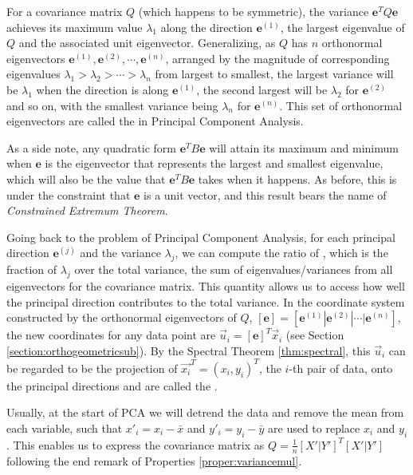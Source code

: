 \begin{thm}
For a covariance matrix $Q$ (which happens to be symmetric), the variance $\textbf{e}^T Q \textbf{e}$ achieves its maximum value $\lambda_1$ along the direction $\textbf{e}^{(1)}$, the largest eigenvalue of $Q$ and the associated unit eigenvector. Generalizing, as $Q$ has $n$ orthonormal eigenvectors $\textbf{e}^{(1)}, \textbf{e}^{(2)}, \cdots, \textbf{e}^{(n)}$, arranged by the magnitude of corresponding eigenvalues $\lambda_1 > \lambda_2 > \cdots > \lambda_n$ from largest to smallest, the largest variance will be $\lambda_1$ when the direction is along $\textbf{e}^{(1)}$, the second largest will be $\lambda_2$ for $\textbf{e}^{(2)}$ and so on, with the smallest variance being $\lambda_n$ for $\textbf{e}^{(n)}$. This set of orthonormal eigenvectors are called the  in Principal Component Analysis.
\end{thm}
As a side note, any quadratic form $\textbf{e}^TB\textbf{e}$ will attain its maximum and minimum when $\textbf{e}$ is the eigenvector that represents the largest and smallest eigenvalue, which will also be the value that $\textbf{e}^TB\textbf{e}$ takes when it happens. As before, this is under the constraint that $\textbf{e}$ is a unit vector, and this result bears the name of \textit{Constrained Extremum Theorem}.\par
Going back to the problem of Principal Component Analysis, for each principal direction $\textbf{e}^{(j)}$ and the variance $\lambda_{j}$, we can compute the ratio of , which is the fraction of  $\lambda_{j}$ over the total variance, the sum of eigenvalues/variances from all eigenvectors for the covariance matrix. This quantity allows us to access how well the principal direction contributes to the total variance. In the coordinate system constructed by the orthonormal eigenvectors of $Q$, $[\textbf{e}] = [\textbf{e}^{(1)}|\textbf{e}^{(2)}|\cdots|\textbf{e}^{(n)}]$, the new coordinates for any data point are $\vec{u}_i = [\textbf{e}]^T \vec{x}_i$ (see Section \ref{section:orthogeometricsub}). By the Spectral Theorem \ref{thm:spectral}, this $\vec{u}_i$ can be regarded to be the projection of $\vec{x_i}^T = (x_i, y_i)^T$, the $i$-th pair of data, onto the principal directions and are called the . \par
Usually, at the start of PCA we will detrend the data and remove the mean from each variable, such that $x'_i = x_i - \bar{x}$ and $y'_i = y_i - \bar{y}$ are used to replace $x_i$ and $y_i$. This enables us to express the covariance matrix as $Q = \frac{1}{n}[X'|Y']^T[X'|Y']$ following the end remark of Properties \ref{proper:variancemul}. 
